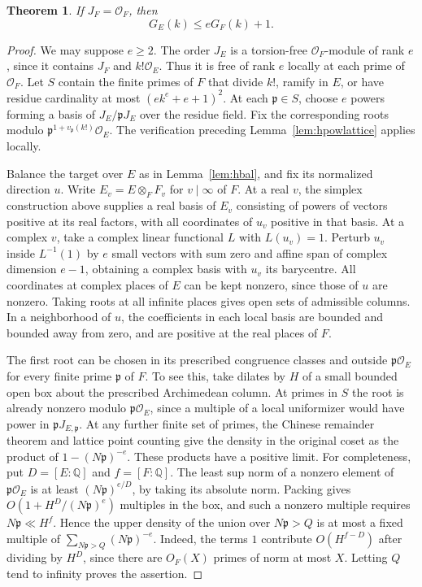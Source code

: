 \documentclass[11pt,letterpaper]{article}
\newtheorem{theorem}{Theorem}[section]
\theoremstyle{definition}
\numberwithin{equation}{section}
\begin{document}
\begin{theorem}\label{thm:hrelative}
If $J_F=\mathcal O_F$, then
\[
                      G_E(k)\le eG_F(k)+1 .
\]
\end{theorem}
\begin{proof}
We may suppose $e\ge2$. The order $J_E$ is a torsion-free
$\mathcal O_F$-module of rank $e$, since it contains $J_F$ and
$k!\mathcal O_E$. Thus it is free of rank $e$ locally at each
prime of $\mathcal O_F$. Let $S$ contain the finite primes of $F$
that divide $k!$, ramify in $E$, or have residue cardinality at most
$(ek^e+e+1)^2$. At each $\mathfrak p\in S$, choose $e$ powers forming
a basis of $J_E/\mathfrak p J_E$ over the residue field. Fix the
corresponding roots modulo $\mathfrak p^{1+v_{\mathfrak p}(k!)}\mathcal O_E$.
The verification preceding Lemma~\ref{lem:hpowlattice} applies locally.

Balance the target over $E$ as in Lemma~\ref{lem:hbal}, and fix its
normalized direction $u$. Write $E_v=E\otimes_F F_v$ for $v\mid\infty$
of $F$. At a real $v$, the simplex construction above supplies a real
basis of $E_v$ consisting of powers of vectors positive at its real
factors, with all coordinates of $u_v$ positive in that basis.
At a complex $v$, take a complex linear functional $L$ with
$L(u_v)=1$. Perturb $u_v$ inside $L^{-1}(1)$ by $e$ small vectors
with sum zero and affine span of complex dimension $e-1$, obtaining
a complex basis with $u_v$ its barycentre. All coordinates at complex
places of $E$ can be kept nonzero, since those of $u$ are nonzero.
Taking roots at all infinite places gives open sets of admissible
columns. In a neighborhood of $u$, the coefficients in each local
basis are bounded and bounded away from zero, and are positive at
the real places of $F$.

The first root can be chosen in its prescribed congruence classes
and outside $\mathfrak p\mathcal O_E$ for every finite prime
$\mathfrak p$ of $F$. To see this, take dilates by $H$ of a small
bounded open box about the prescribed Archimedean column.
At primes in $S$ the root is already nonzero modulo
$\mathfrak p\mathcal O_E$, since a multiple of a local uniformizer
would have power in $\mathfrak p J_{E,\mathfrak p}$.
At any further finite set of primes, the Chinese remainder theorem
and lattice point counting give the density in the original coset
as the product of $1-(N\mathfrak p)^{-e}$. These products have a
positive limit. For completeness, put $D=[E:\mathbb Q]$ and
$f=[F:\mathbb Q]$. The least sup norm of a nonzero element of
$\mathfrak p\mathcal O_E$ is at least $(N\mathfrak p)^{e/D}$,
by taking its absolute norm. Packing gives
$O(1+H^D/(N\mathfrak p)^e)$ multiples in the box, and such a
nonzero multiple requires $N\mathfrak p\ll H^f$. Hence the
upper density of the union over $N\mathfrak p>Q$ is at most
a fixed multiple of $\sum_{N\mathfrak p>Q}(N\mathfrak p)^{-e}$.
Indeed, the terms $1$ contribute $O(H^{f-D})$ after dividing
by $H^D$, since there are $O_F(X)$ primes of norm at most $X$.
Letting $Q$ tend to infinity proves the assertion.


\end{proof}
\end{document}
